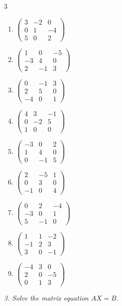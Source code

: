 \begin{multicols}{3}
\begin{enumerate}[label=\arabic*.,  leftmargin=*]
\item $\begin{pmatrix}3&-2&0\\0&1&-4\\5&0&2\end{pmatrix}$
\item $\begin{pmatrix}1&0&-5\\-3&4&0\\2&-1&3\end{pmatrix}$
\item $\begin{pmatrix}0&-1&3\\2&5&0\\-4&0&1\end{pmatrix}$
\item $\begin{pmatrix}4&3&-1\\0&-2&5\\1&0&0\end{pmatrix}$
\item $\begin{pmatrix}-3&0&2\\1&4&0\\0&-1&5\end{pmatrix}$
\item $\begin{pmatrix}2&-5&1\\0&3&0\\-1&0&4\end{pmatrix}$
\item $\begin{pmatrix}0&2&-4\\-3&0&1\\5&-1&0\end{pmatrix}$
\item $\begin{pmatrix}1&1&-2\\-1&2&3\\3&0&-1\end{pmatrix}$
\item $\begin{pmatrix}-4&3&0\\2&0&-5\\0&1&3\end{pmatrix}$
\end{enumerate}
\end{multicols}
\emph{3. Solve the matrix equation $AX=B$.}
\bigskip
